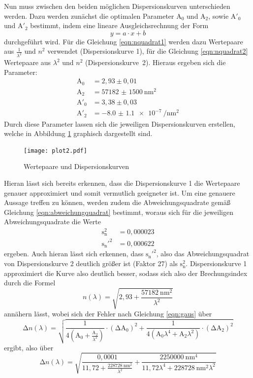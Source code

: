 Nun muss zwischen den beiden möglichen Dispersionskurven unterschieden werden.
Dazu werden zunächst die optimalen Parameter $\text{A}_0$ und $\text{A}_2$, sowie
$\text{A}'_0$ und $\text{A}'_2$
bestimmt, indem eine lineare Ausgleichsrechnung der Form
\begin{equation}
  y = a\cdot x +b
  \label{eqn:linear}
\end{equation}
durchgeführt wird. Für die Gleichung \ref{eqn:nquadrat1} werden dazu Wertepaare aus $\frac{1}{\lambda^2}$
und $n^2$ verwendet (Dispersionskurve 1), für die Gleichung \ref{eqn:nquadrat2} Wertepaare aus $\lambda^2$
und $n^2$ (Dispersionskurve~2).
Hieraus ergeben sich die Parameter:
\begin{align*}
  \text{A}_0 &= 2,93 \pm 0,01 \\
  \text{A}_2 &= \SI{57182(1500)}{\nano\meter\squared} \\
  \text{A}'_0 &= 3,38 \pm 0,03 \\
  \text{A}'_2 &= \SI{-8.0(11)e-7}{\per\nano\meter\squared}
\end{align*}
Durch diese Parameter lassen sich die jeweiligen Dispersionskurven erstellen, welche in Abbildung
\ref{fig:plot2} graphisch dargestellt sind.
\begin{figure}[H]
  \centering
  \texttt{[image: plot2.pdf]}
  \caption{Wertepaare und Dispersionskurven}
  \label{fig:plot2}
\end{figure}
Hieran lässt sich bereits erkennen, dass die Dispersionskurve 1 die Wertepaare genauer
approximiert und somit vermutlich geeigneter ist.
Um eine genauere Aussage treffen zu können, werden zudem die Abweichungsquadrate gemäß
Gleichung \ref{eqn:abweichungquadrat} bestimmt, woraus sich für die jeweiligen Abweichungsquadrate
die Werte
\begin{align*}
  \text{s}_{\text{n}}^2 &= 0,000023 \\
  \text{s}_{\text{n}}'^2 &= 0,000622
\end{align*}
ergeben.
Auch hieran lässt sich erkennen, dass $\text{s}_{\text{n}}'^2$, also das Abweichungsquadrat
von Dispersionskurve 2 deutlich größer ist (Faktor 27) als $\text{s}_{\text{n}}^2$.
Dispersionskurve 1 approximiert die Kurve also deutlich besser, sodass sich also
der Brechungsindex durch die Formel
\begin{equation}
  n(\lambda) = \sqrt{2,93 + \frac{\SI{57182}{\nano\meter\squared}}{{\lambda}^2}}
  \label{eqn:brech}
\end{equation}
annähern lässt, wobei sich der Fehler nach Gleichung \ref{eqn:gaus} über
\begin{equation}
    \increment n(\lambda) = \sqrt{\frac{1}{4(\text{A}_0+\frac{\text{A}_2}{{\lambda}^2})}
    \cdot (\increment \text{A}_0)^2
    + \frac{1}{4(\text{A}_0 {\lambda}^4 +\text{A}_2{\lambda}^2)}
    \cdot (\increment \text{A}_2)^2}
\end{equation}
ergibt, also über
\begin{equation}
    \increment n(\lambda) = \sqrt{\frac{0,0001}{11,72+\frac{\SI{228728}{\nano\meter\squared}}{{\lambda}^2}}
    + \frac{\SI{2250000}{\nano\meter^4}}{11,72 {\lambda}^4 +\SI{228728}{\nano\meter\squared}{\lambda}^2}}
\end{equation}

